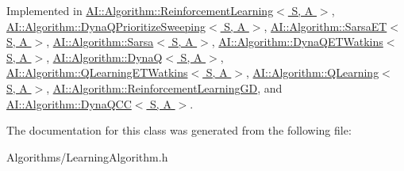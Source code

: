 Implemented in \hyperlink{classAI_1_1Algorithm_1_1ReinforcementLearning_a25d7fa245a79e61061436dc0f1db90cb}{A\-I\-::\-Algorithm\-::\-Reinforcement\-Learning$<$ S, A $>$}, \hyperlink{classAI_1_1Algorithm_1_1DynaQPrioritizeSweeping_ad08b55f3cf927189dd31abf9fc1c2959}{A\-I\-::\-Algorithm\-::\-Dyna\-Q\-Prioritize\-Sweeping$<$ S, A $>$}, \hyperlink{classAI_1_1Algorithm_1_1SarsaET_adf13376b7ec8fdfa2b19ffadb1aa81e7}{A\-I\-::\-Algorithm\-::\-Sarsa\-E\-T$<$ S, A $>$}, \hyperlink{classAI_1_1Algorithm_1_1Sarsa_ae1d62478d3e31cace3fb594e05f83d1c}{A\-I\-::\-Algorithm\-::\-Sarsa$<$ S, A $>$}, \hyperlink{classAI_1_1Algorithm_1_1DynaQETWatkins_aa4e40af0fd705cd5d1f7fd13834c57c6}{A\-I\-::\-Algorithm\-::\-Dyna\-Q\-E\-T\-Watkins$<$ S, A $>$}, \hyperlink{classAI_1_1Algorithm_1_1DynaQ_a4542226b17db4ed8a2c5ec17d37dc42f}{A\-I\-::\-Algorithm\-::\-Dyna\-Q$<$ S, A $>$}, \hyperlink{classAI_1_1Algorithm_1_1QLearningETWatkins_a5cbad8c16dfbf6fe72c85fe5c8c4e273}{A\-I\-::\-Algorithm\-::\-Q\-Learning\-E\-T\-Watkins$<$ S, A $>$}, \hyperlink{classAI_1_1Algorithm_1_1QLearning_a042e1987ce21a94f59603c4cb1eeed82}{A\-I\-::\-Algorithm\-::\-Q\-Learning$<$ S, A $>$}, \hyperlink{classAI_1_1Algorithm_1_1ReinforcementLearningGD_afca8d60ac090dec611f3834c0e8872c0}{A\-I\-::\-Algorithm\-::\-Reinforcement\-Learning\-G\-D}, and \hyperlink{classAI_1_1Algorithm_1_1DynaQCC_ae23b8f0afbb9fc5024aef9ce720c9b84}{A\-I\-::\-Algorithm\-::\-Dyna\-Q\-C\-C$<$ S, A $>$}.



The documentation for this class was generated from the following file\-:\begin{DoxyCompactItemize}
\item 
Algorithms/Learning\-Algorithm.\-h\end{DoxyCompactItemize}
